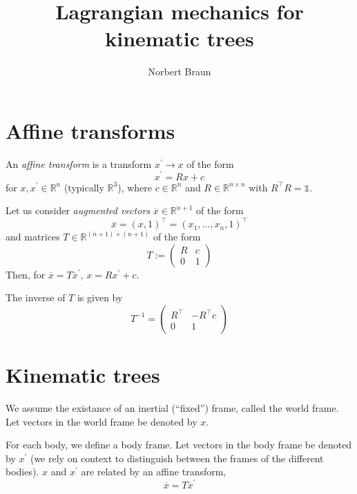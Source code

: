\documentclass[a4paper]{article}
\title{Lagrangian mechanics for kinematic trees}
\author{Norbert Braun}
\begin{document}
\maketitle
\section{Affine transforms}
An \textit{affine transform} is a transform $x^\prime \to x$ of the form
\begin{equation}
x^\prime = Rx + c
\end{equation}
for $x, x^\prime \in \mathbb{R}^n$ (typically $\mathbb{R}^3$), where $c \in \mathbb{R}^n$ and $R \in \mathbb{R}^{n \times n}$ with $R^\top R = \mathbb{1}$.

Let us consider \textit{augmented vectors} $\overline{x} \in \mathbb{R}^{n+1}$ of the form
\begin{equation}
\overline{x} = (x, 1)^\top = (x_1, \ldots, x_n, 1)^\top
\end{equation}
and matrices $T \in \mathbb{R}^{(n+1)\times(n+1)}$ of the form
\begin{equation}
T := \left( \begin{array}{cc}
R & c\\
0 & 1\end{array}\right)
\end{equation}
Then, for $\overline{x} = T \overline{x}^\prime$, $x = R x^\prime + c$.

The inverse of $T$ is given by
\begin{equation}
T^{-1} = \left(\begin{array}{cc}
R^\top & -R^\top c\\
0 & 1
\end{array}\right)
\end{equation}

\section{Kinematic trees}
We assume the existance of an inertial (``fixed'') frame, called the world frame. Let vectors in the world frame be denoted by $x$.

For each body, we define a body frame. Let vectors in the body frame be denoted by $x^\prime$ (we rely on context to distinguish between the frames of the different bodies). $x$ and $x^\prime$ are related by an affine transform,
\begin{equation}
\overline{x} = T \overline{x}^\prime
\end{equation}
\end{document}
